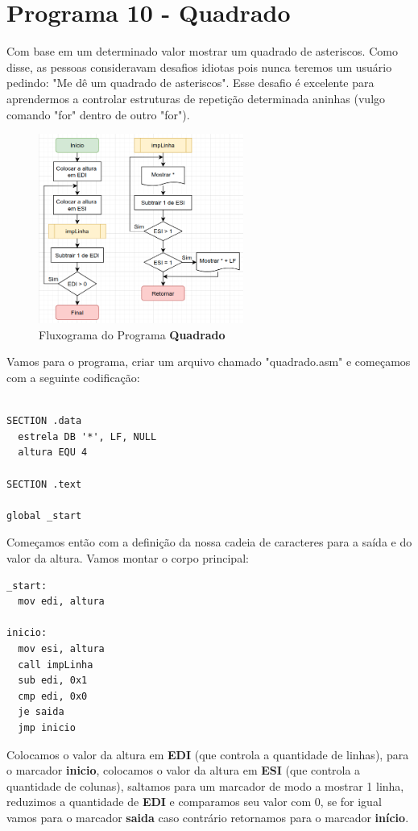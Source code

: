 \section{Programa 10 - Quadrado}
Com base em um determinado valor mostrar um quadrado de asteriscos. Como disse, as pessoas consideravam desafios idiotas pois nunca teremos um usuário pedindo: "Me dê um quadrado de asteriscos". Esse desafio é excelente para aprendermos a controlar estruturas de repetição determinada aninhas (vulgo comando "for" dentro de outro "for"). 
\begin{figure}[H]
	\centering
	\includegraphics[width=0.6\textwidth]{Pictures/cap03/programa10}
	\caption{Fluxograma do Programa \textbf{Quadrado}}
\end{figure}

Vamos para o programa, criar um arquivo chamado "quadrado.asm" e começamos com a seguinte codificação:
\begin{lstlisting}[]
%include 'bibliotecaE.inc'

SECTION .data
  estrela DB '*', LF, NULL
  altura EQU 4

SECTION .text

global _start
\end{lstlisting}

Começamos então com a definição da nossa cadeia de caracteres para a saída e do valor da altura. Vamos montar o corpo principal:

\begin{lstlisting}[]
_start:
  mov edi, altura

inicio:
  mov esi, altura
  call impLinha
  sub edi, 0x1
  cmp edi, 0x0
  je saida
  jmp inicio	
\end{lstlisting}

Colocamos o valor da altura em \textbf{EDI} (que controla a quantidade de linhas), para o marcador \textbf{inicio}, colocamos o valor da altura em \textbf{ESI} (que controla a quantidade de colunas), saltamos para um marcador de modo a mostrar 1 linha, reduzimos a quantidade de \textbf{EDI} e comparamos seu valor com 0, se for igual vamos para o marcador \textbf{saida} caso contrário retornamos para o marcador \textbf{início}.

